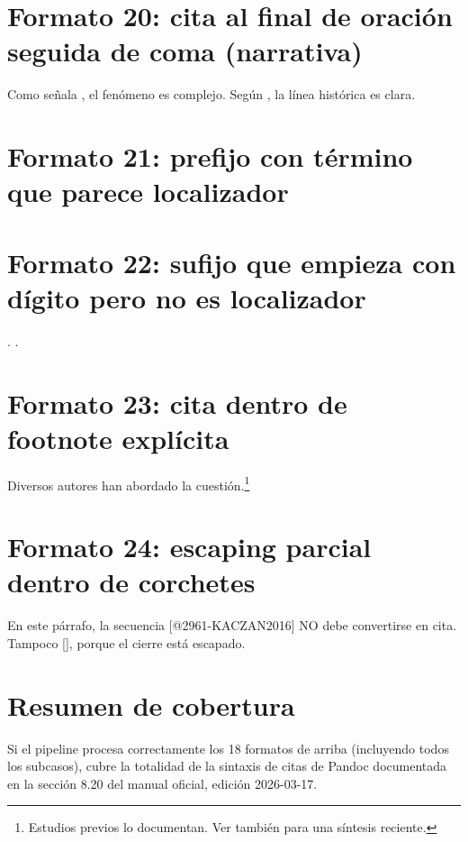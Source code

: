 \section{Formato 20: cita al final de oración seguida de coma (narrativa)}
Como señala \textcite{2961-KACZAN2016}, el fenómeno es complejo. Según \textcite{3041-PINEAU1999}, la línea histórica es clara.


\section{Formato 21: prefijo con término que parece localizador}
\autocite[cap. 3 de][]{2961-KACZAN2016}\autocite[vol. 1 de][p. 45]{3036-ORBUCH2020}


\section{Formato 22: sufijo que empieza con dígito pero no es localizador}
\autocite[2020 es un año clave para el estudio]{2961-KACZAN2016}. \autocite[1999 vio la primera edición]{3041-PINEAU1999}.


\section{Formato 23: cita dentro de footnote explícita}
Diversos autores han abordado la cuestión.\footnote{Estudios previos
  \autocite{2961-KACZAN2016,3041-PINEAU1999}
  lo documentan. Ver también
  \textcite[cap. 2]{3036-ORBUCH2020}
  para una síntesis reciente.}


\section{Formato 24: escaping parcial dentro de corchetes}
En este párrafo, la secuencia [@2961-KACZAN2016] NO debe convertirse en cita. Tampoco [\textcite{3041-PINEAU1999}], porque el cierre está escapado.


\section{Resumen de cobertura}
Si el pipeline procesa correctamente los 18 formatos de arriba (incluyendo todos los subcasos), cubre la totalidad de la sintaxis de citas de Pandoc documentada en la sección 8.20 del manual oficial, edición 2026-03-17.


